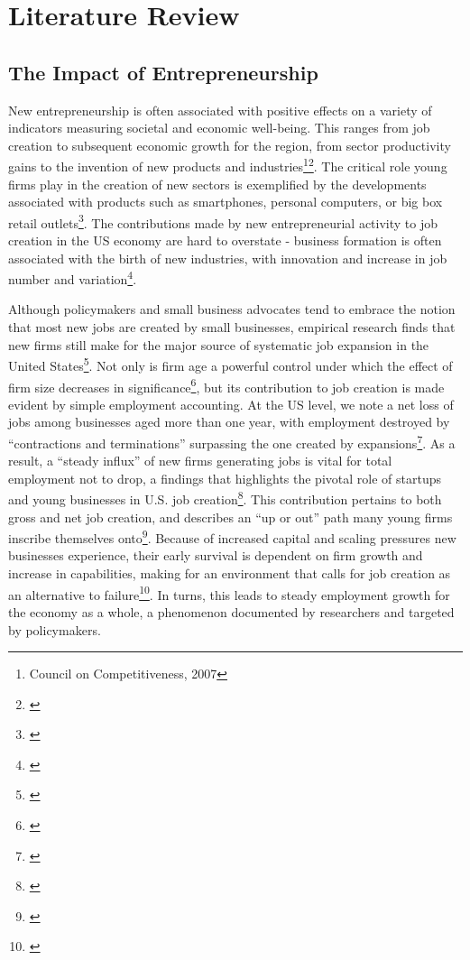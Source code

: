 
\chapter{Literature Review\label{ch:pastwork}}

\section{The Impact of Entrepreneurship}

New entrepreneurship is often associated with positive effects on a variety of indicators measuring societal and economic well-being. This ranges from job creation to subsequent economic growth for the region, from sector productivity gains to the invention of new products and industries\footnote{Council on Competitiveness, 2007}\hspace{.15em}\footnote{\cite{Reynolds2007}}. The critical role young firms play in the creation of new sectors is exemplified by the developments associated with products such as smartphones, personal computers, or big box retail outlets\footnote{\cite{GartnerShaverCarterReynolds2004}}. The contributions made by new entrepreneurial activity to job creation in the US economy are hard to overstate - business formation is often associated with the birth of new industries, with innovation and increase in job number and variation\footnote{\cite{ReynoldsWhite1997}}. 

Although policymakers and small business advocates tend to embrace the notion that most new jobs are created by small businesses, empirical research finds that new firms still make for the major source of systematic job expansion in the United States\footnote{\cite{AcsArmington2004}}. Not only is firm age a powerful control under which the effect of firm size decreases in significance\footnote{\cite{HaltiwangerJarminMiranda2013}}, but its contribution to job creation is made evident by simple employment accounting. At the US level, we note a net loss of jobs among businesses aged more than one year, with employment destroyed by ``contractions and terminations'' surpassing the one created by expansions\footnote{\cite{AcsArmington2004}}. As a result, a ``steady influx'' of new firms generating jobs is vital for total employment not to drop, a findings that highlights the pivotal role of startups and young businesses in U.S. job creation\footnote{\cite{AcsArmington2004}}. This contribution pertains to both gross and net job creation, and describes an ``up or out'' path many young firms inscribe themselves onto\footnote{\cite{AcsArmington2004}}. Because of increased capital and scaling pressures new businesses experience, their early survival is dependent on firm growth and increase in capabilities, making for an environment that calls for job creation as an alternative to failure\footnote{\cite{AcsArmington2004}}. In turns, this leads to steady employment growth for the economy as a whole, a phenomenon documented by researchers and targeted by policymakers.


